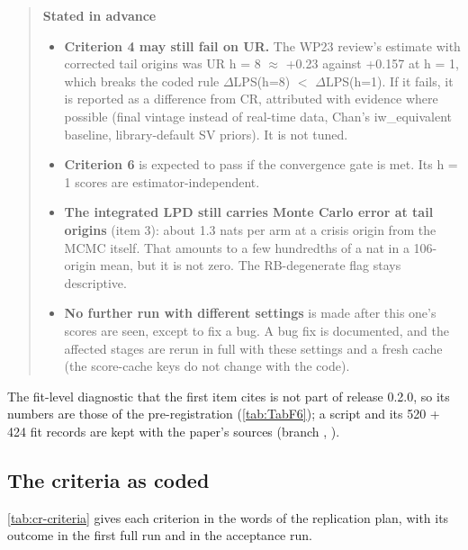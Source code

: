 \begin{quote}
\medskip\noindent\textbf{Stated in advance}
\begin{itemize}
\item \textbf{Criterion 4 may still fail on UR.} The WP23 review's estimate with corrected tail
origins was UR h = 8 $\approx$ +0.23 against +0.157 at h = 1, which breaks the coded rule
$\Delta$LPS(h=8) $<$ $\Delta$LPS(h=1). If it fails, it is reported as a difference from CR,
attributed with evidence where possible (final vintage instead of real-time data, Chan's
iw\_equivalent baseline, library-default SV priors). It is not tuned.
\item \textbf{Criterion 6} is expected to pass if the convergence gate is met. Its h = 1 scores are
estimator-independent.
\item \textbf{The integrated LPD still carries Monte Carlo error at tail origins} (item 3): about
1.3 nats per arm at a crisis origin from the MCMC itself. That amounts to a few hundredths of a nat
in a 106-origin mean, but it is not zero. The RB-degenerate flag stays descriptive.
\item \textbf{No further run with different settings} is made after this one's scores are seen,
except to fix a bug. A bug fix is documented, and the affected stages are rerun in full with these
settings and a fresh cache (the score-cache keys do not change with the code).
\end{itemize}
\end{quote}

The fit-level diagnostic that the first item cites is not part of release 0.2.0, so its numbers
are those of the pre-registration (\cref{tab:TabF6}); a script and its 520 + 424 fit records are
kept with the paper's sources (branch ,
).

\subsection{The criteria as coded}\label{app:cr-criteria}

\cref{tab:cr-criteria} gives each criterion in the words of the replication plan, with its outcome
in the first full run and in the acceptance run.

